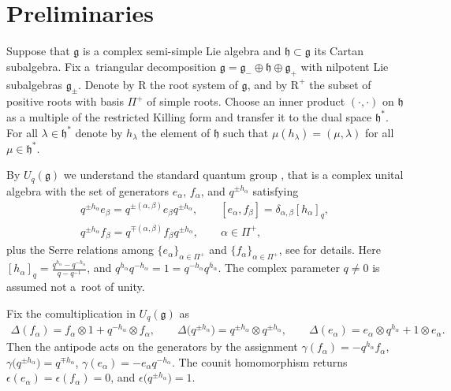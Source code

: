 \section{Preliminaries}\label{SecPrelim}
Suppose that $\mathfrak{g}$ is a complex semi-simple Lie algebra and $\mathfrak{h}\subset \mathfrak{g}$ its Cartan subalgebra. Fix a~triangular decomposition $\mathfrak{g}=\mathfrak{g}_-\oplus \mathfrak{h}\oplus \mathfrak{g}_+$ with nilpotent Lie subalgebras $\mathfrak{g}_\pm$. Denote by $\mathrm{R}$ the root system of $\mathfrak{g}$, and by $\mathrm{R}^+$ the subset of positive roots with basis $\Pi^+$ of simple roots. Choose an inner product $(\cdot,\cdot)$ on $\mathfrak{h}$ as a multiple of the restricted Killing form and transfer it to the dual space $\mathfrak{h}^*$. For all $\lambda\in \mathfrak{h}^*$ denote by $h_\lambda$ the element of $\mathfrak{h}$ such that $\mu(h_\lambda)=(\mu,\lambda)$ for all $\mu\in \mathfrak{h}^*$.

By $U_q(\mathfrak{g})$ we understand the standard quantum group \cite{ChP, D3}, that is a complex unital algebra with the set of generators $e_\alpha$, $f_\alpha$, and $q^{\pm h_\alpha}$ satisfying
\begin{gather*}
q^{\pm h_\alpha}e_\beta=q^{\pm (\alpha,\beta)}e_\beta q^{\pm h_\alpha}, \qquad [e_\alpha,f_\beta]=\delta_{\alpha,\beta}[h_\alpha]_q,\\
q^{\pm h_\alpha}f_\beta=q^{\mp (\alpha,\beta)}f_\beta q^{\pm h_\alpha},\qquad \alpha \in \Pi^+,
\end{gather*}
plus the Serre relations among $\{e_\alpha\}_{\alpha\in \Pi^+}$ and $\{f_\alpha\}_{\alpha\in \Pi^+}$, see \cite{ChP} for details. Here $[h_\alpha]_q=\frac{q^{h_\alpha}-q^{-h_\alpha}}{q-q^{-1}}$, and $q^{h_\alpha}q^{-h_\alpha}=1=q^{-h_\alpha}q^{h_\alpha}$. The complex parameter $q\not =0$ is assumed not a~root of unity.

Fix the comultiplication in $U_q(\mathfrak{g})$ as
\begin{gather*}
\Delta(f_\alpha)= f_\alpha\otimes 1+q^{-h_\alpha}\otimes f_\alpha,\qquad\!\! \Delta\big(q^{\pm h_\alpha}\big)=q^{\pm h_\alpha}\otimes q^{\pm h_\alpha},\qquad\!\!\Delta(e_\alpha)= e_\alpha\otimes q^{h_\alpha}+1\otimes e_\alpha.
\end{gather*}
Then the antipode acts on the generators by the assignment $\gamma( f_\alpha)=- q^{h_\alpha}f_\alpha$, $\gamma\big( q^{\pm h_\alpha}\big)=q^{\mp h_\alpha}$, $\gamma( e_\alpha)=- e_\alpha q^{-h_\alpha}$. The counit homomorphism returns $\epsilon(e_\alpha)=\epsilon(f_\alpha)=0$, and $\epsilon\big(q^{\pm h_\alpha}\big)=1$.

